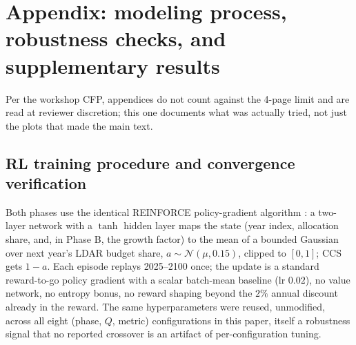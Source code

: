 \documentclass{article}
\begin{document}
\section{Appendix: modeling process, robustness checks, and supplementary results}
\label{sec:appendix}
{\small
Per the workshop CFP, appendices do not count against the 4-page limit
and are read at reviewer discretion; this one documents what was
actually tried, not just the plots that made the main text.

\subsection{RL training procedure and convergence verification}
\label{sec:app-rl}

Both phases use the identical REINFORCE policy-gradient algorithm
\cite{williams1992reinforce}: a two-layer network with a $\tanh$ hidden
layer maps the state (year index, allocation share, and, in Phase B, the
growth factor) to the mean of a bounded Gaussian over next year's LDAR
budget share, $a\sim\mathcal{N}(\mu,0.15)$, clipped to $[0,1]$; CCS gets
$1-a$. Each episode replays 2025--2100 once; the update is a standard
reward-to-go policy gradient with a scalar batch-mean baseline (lr
$0.02$), no value network, no entropy bonus, no reward shaping beyond
the $2\%$ annual discount already in the reward. The same hyperparameters
were reused, unmodified, across all eight (phase, $Q$, metric)
configurations in this paper, itself a robustness signal that no
reported crossover is an artifact of per-configuration tuning.

}
\end{document}
